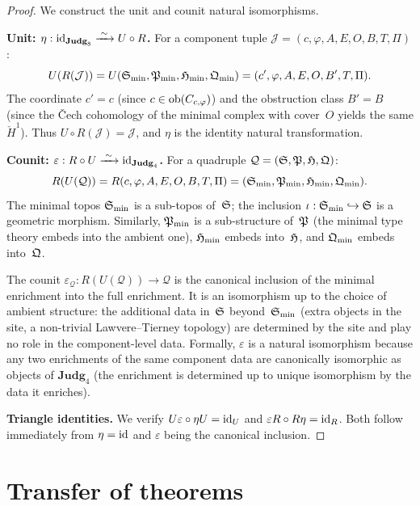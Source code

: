 \begin{proof}
We construct the unit and counit natural isomorphisms.

\medskip
\noindent\textbf{Unit: $\eta : \mathrm{id}_{\mathbf{Judg}_8}
\xrightarrow{\;\sim\;} U \circ R$.}
For a component tuple
$\mathcal{J} = (c, \varphi, A, E, O, B, T, \Pi)$:
\[
  U(R(\mathcal{J}))
  = U(\mathfrak{S}_{\min}, \mathfrak{P}_{\min}, \mathfrak{H}_{\min}, \mathfrak{Q}_{\min})
  = (c', \varphi, A, E, O, B', T, \Pi).
\]
The coordinate $c' = c$ (since $c \in \mathrm{ob}(C_{c,\varphi})$) and the
obstruction class $B' = B$ (since the \v{C}ech cohomology of the
minimal complex with cover~$O$ yields the same $\check{H}^1$).
Thus $U \circ R(\mathcal{J}) = \mathcal{J}$, and $\eta$ is the
identity natural transformation.

\medskip
\noindent\textbf{Counit: $\varepsilon : R \circ U
\xrightarrow{\;\sim\;} \mathrm{id}_{\mathbf{Judg}_4}$.}
For a quadruple $\mathcal{Q} = (\mathfrak{S}, \mathfrak{P}, \mathfrak{H}, \mathfrak{Q})$:
\[
  R(U(\mathcal{Q}))
  = R(c, \varphi, A, E, O, B, T, \Pi)
  = (\mathfrak{S}_{\min}, \mathfrak{P}_{\min}, \mathfrak{H}_{\min}, \mathfrak{Q}_{\min}).
\]
The minimal topos $\mathfrak{S}_{\min}$ is a sub-topos of~$\mathfrak{S}$; the
inclusion $\iota : \mathfrak{S}_{\min} \hookrightarrow \mathfrak{S}$ is a geometric
morphism.  Similarly, $\mathfrak{P}_{\min}$ is a sub-structure of~$\mathfrak{P}$
(the minimal type theory embeds into the ambient one), $\mathfrak{H}_{\min}$
embeds into~$\mathfrak{H}$, and $\mathfrak{Q}_{\min}$ embeds into~$\mathfrak{Q}$.

The counit $\varepsilon_\mathcal{Q} : R(U(\mathcal{Q})) \to \mathcal{Q}$
is the canonical inclusion of the minimal enrichment into the full
enrichment.  It is an isomorphism up to the choice of ambient structure:
the additional data in~$\mathfrak{S}$ beyond~$\mathfrak{S}_{\min}$ (extra objects in
the site, a non-trivial Lawvere--Tierney topology) are determined by
the site and play no role in the component-level data.  Formally,
$\varepsilon$ is a natural isomorphism because any two enrichments of
the same component data are canonically isomorphic as objects of
$\mathbf{Judg}_4$ (the enrichment is determined up to unique
isomorphism by the data it enriches).

\medskip
\noindent\textbf{Triangle identities.}
We verify $U \varepsilon \circ \eta U = \mathrm{id}_U$ and
$\varepsilon R \circ R \eta = \mathrm{id}_R$.  Both follow immediately from
$\eta = \mathrm{id}$ and $\varepsilon$ being the canonical inclusion.
\end{proof}

\section{Transfer of theorems}

